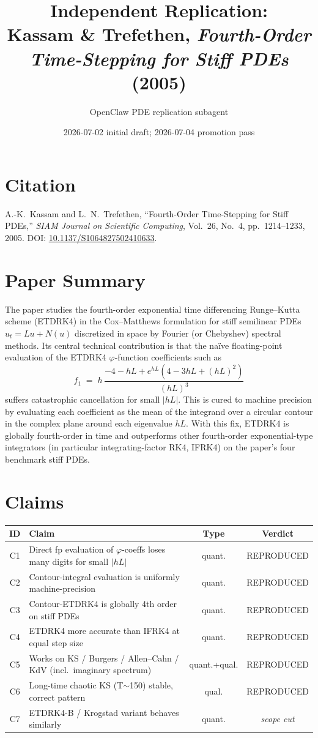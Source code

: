 \documentclass[11pt]{article}
\title{Independent Replication:\\
Kassam \& Trefethen, \emph{Fourth-Order Time-Stepping for Stiff PDEs} (2005)}
\author{OpenClaw PDE replication subagent}
\date{2026-07-02 initial draft; 2026-07-04 promotion pass}
\begin{document}
\maketitle

\section{Citation}
A.-K.~Kassam and L.~N.~Trefethen, ``Fourth-Order Time-Stepping for Stiff PDEs,''
\emph{SIAM Journal on Scientific Computing}, Vol.~26, No.~4, pp.~1214--1233, 2005.
DOI: \href{https://doi.org/10.1137/S1064827502410633}{10.1137/S1064827502410633}.

\section{Paper Summary}
The paper studies the fourth-order exponential time differencing Runge--Kutta
scheme (ETDRK4) in the Cox--Matthews formulation for stiff semilinear PDEs
$u_t = L u + N(u)$ discretized in space by Fourier (or Chebyshev) spectral
methods. Its central technical contribution is that the na\"ive floating-point
evaluation of the ETDRK4 $\varphi$-function coefficients such as
\[
  f_1 \;=\; h\,\frac{-4 - hL + e^{hL}(4 - 3hL + (hL)^2)}{(hL)^3}
\]
suffers catastrophic cancellation for small $|hL|$. This is cured to
machine precision by evaluating each coefficient as the mean of the
integrand over a circular contour in the complex plane around each
eigenvalue $hL$. With this fix, ETDRK4 is globally fourth-order in time
and outperforms other fourth-order exponential-type integrators (in
particular integrating-factor RK4, IFRK4) on the paper's four benchmark
stiff PDEs.

\section{Claims}
\begin{center}\small
\begin{tabular}{clcc}
\toprule
ID & Claim & Type & Verdict \\
\midrule
C1 & Direct fp evaluation of $\varphi$-coeffs loses many digits for small $|hL|$ & quant. & REPRODUCED \\
C2 & Contour-integral evaluation is uniformly machine-precision & quant. & REPRODUCED \\
C3 & Contour-ETDRK4 is globally 4th order on stiff PDEs & quant. & REPRODUCED \\
C4 & ETDRK4 more accurate than IFRK4 at equal step size & quant. & REPRODUCED \\
C5 & Works on KS / Burgers / Allen--Cahn / KdV (incl.\ imaginary spectrum) & quant.+qual. & REPRODUCED \\
C6 & Long-time chaotic KS (T$\sim$150) stable, correct pattern & qual. & REPRODUCED \\
C7 & ETDRK4-B / Krogstad variant behaves similarly & quant. & \emph{scope cut} \\
\bottomrule
\end{tabular}
\end{center}
\end{document}
